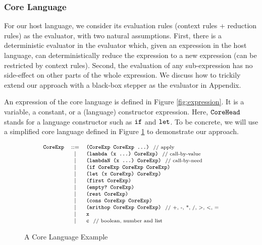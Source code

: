 \subsubsection{Core Language}

For our host language, we consider its evaluation rules (context rules + reduction rules) as the evaluator, with two natural assumptions. First, there is a deterministic evaluator in the evaluator which, given an expression in the host language, can deterministically reduce the expression to a new expression (can be restricted by context rules). Second, the evaluation of any sub-expression has no side-effect on other parts of the whole expression. We discuss how to trickily extend our approach with a black-box stepper as the evaluator in Appendix.

An expression of the core language is defined in Figure \ref{fig:expression}. It is a variable, a constant, or a (language) constructor expression. Here, $\mbox{\tt CoreHead}$ stands for a language constructor such as $\mbox{\tt if}$ and $\mbox{\tt let}$. To be concrete, we will use a simplified core language defined in Figure \ref{fig:core} to demonstrate our approach.

\begin{figure}[thb]
\begin{centering}
	\[
	{\footnotesize
			\begin{array}{lcl}
			\mbox{\tt CoreExp} &::=& \texttt{(CoreExp~CoreExp~...)} ~~\mbox{{\scriptsize // apply}}\\
			&|& \mbox{\tt (lambda~(x~...)~CoreExp)} ~~\mbox{{\scriptsize // call-by-value}}\\
			&|& \mbox{\tt (lambdaN~(x~...)~CoreExp)} ~~\mbox{{\scriptsize // call-by-need}}\\
			&|& \mbox{\tt (if~CoreExp~CoreExp~CoreExp)}\\
			&|& \mbox{\tt (let~(x~CoreExp)~CoreExp)}\\
			&|& \mbox{\tt (first~CoreExp)}\\
			&|& \mbox{\tt (empty?~CoreExp)}\\
			&|& \mbox{\tt (rest~CoreExp)}\\
			&|& \mbox{\tt (cons~CoreExp~CoreExp)}\\
			&|& \mbox{\tt (arithop~CoreExp~CoreExp)} ~~\mbox{{\scriptsize // +, -, *, /, >, <, =}}\\
			&|& \mbox{\tt x}\\
			&|& \mbox{\tt c} ~~\mbox{{\scriptsize // boolean, number and list}}
			\end{array}
	}	
	\]
\end{centering}
\caption{A Core Language Example}
\label{fig:core}
\end{figure}


